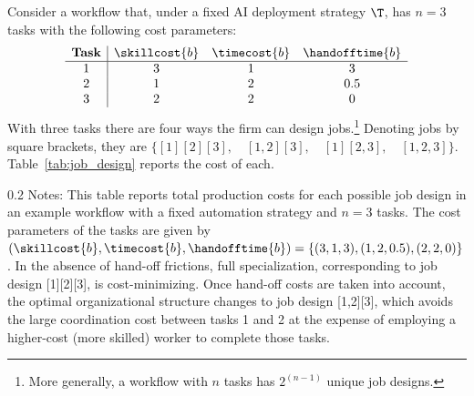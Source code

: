 Consider a workflow that, under a fixed AI deployment strategy $\T$, has $n=3$ tasks with the following cost parameters:
\[
\begin{array}{c|ccc}
\textbf{Task} & \skillcost{b} & \timecost{b} & \handofftime{b} \\ \hline
1 & 3  & 1   & 3 \\
2 & 1  & 2   & 0.5 \\
3 & 2  & 2   & 0 \\
\end{array}
\]
With three tasks there are four ways the firm can design jobs.\footnote{
More generally, a workflow with $n$ tasks has $2^{(n-1)}$ unique job designs.
}
Denoting jobs by square brackets, they are
$\{[1][2][3], \quad [1,2][3], \quad [1][2,3], \quad [1,2,3]\}$.
Table~\ref{tab:job_design} reports the cost of each.
\begin{table}[!t]
    \caption{Role of Hand-off Costs in Organizational Structure}
    \vspace{-0.4cm}
    \centering
    \label{tab:job_design}
    \footnotesize
    \begin{minipage}{1\linewidth}
\begin{spacing}{0.2}
{\fontsize{9.5pt}{10pt}\selectfont Notes: This table reports total production costs for each possible job design in an example workflow with a fixed automation strategy and $n = 3$ tasks.
The cost parameters of the tasks are given by $(\skillcost{b},\timecost{b},\handofftime{b})=\{(3,1,3),(1,2,0.5),(2,2,0)\}$.
In the absence of hand-off frictions, full specialization, corresponding to job design [1][2][3], is cost-minimizing.
Once hand-off costs are taken into account, the optimal organizational structure changes to job design [1,2][3], which avoids the large coordination cost between tasks 1 and 2 at the expense of employing a higher-cost (more skilled) worker to complete those tasks.}
\end{spacing}
\end{minipage}
\end{table}
